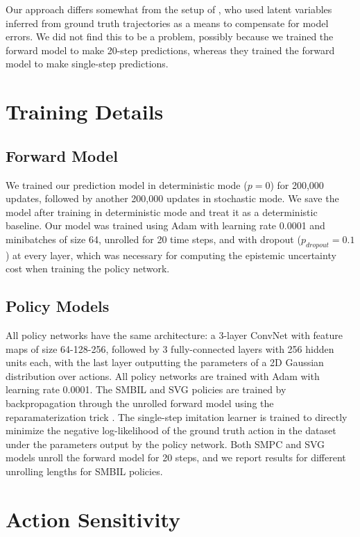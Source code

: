 \documentclass{article} %
\begin{document}
    Our approach differs somewhat from the setup of \citep{SVG}, who used latent variables inferred from ground truth trajectories as a means to compensate for model errors. We did not find this to be a problem, possibly because we trained the forward model to make 20-step predictions, whereas they trained the forward model to make single-step predictions.



    \section{Training Details}
    \label{training-details-appendix}

    \subsection{Forward Model}
    We trained our prediction model in deterministic mode ($p=0$) for 200,000 updates, followed by another 200,000 updates in stochastic mode.
    We save the model after training in deterministic mode and treat it as a deterministic baseline.
    Our model was trained using Adam \citep{ADAM} with learning rate 0.0001 and minibatches of size 64, unrolled for 20 time steps, and with dropout ($p_{dropout}=0.1$) at every layer, which was necessary for computing the epistemic uncertainty cost when training the policy network.

    \subsection{Policy Models}

    All policy networks have the same architecture: a 3-layer ConvNet with feature maps of size 64-128-256, followed by 3 fully-connected layers with 256 hidden units each, with the last layer outputting the parameters of a 2D Gaussian distribution over actions. All policy networks are trained with Adam with learning rate 0.0001. The SMBIL and SVG policies are trained by backpropagation through the unrolled forward model using the reparamaterization trick \citep{VAE}. The single-step imitation learner is trained to directly minimize the negative log-likelihood of the ground truth action in the dataset under the parameters output by the policy network. Both SMPC and SVG models unroll the forward model for 20 steps, and we report results for different unrolling lengths for SMBIL policies.


    \section{Action Sensitivity}
    \label{action-sensitivity-appendix}
\end{document}
